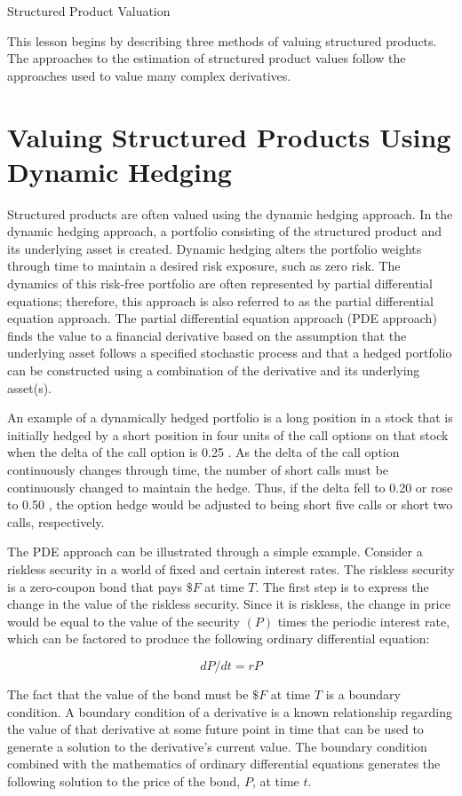 \documentclass[11pt]{article}
\begin{document}
Structured Product Valuation

This lesson begins by describing three methods of valuing structured products. The approaches to the estimation of structured product values follow the approaches used to value many complex derivatives.

\section*{Valuing Structured Products Using Dynamic Hedging}
Structured products are often valued using the dynamic hedging approach. In the dynamic hedging approach, a portfolio consisting of the structured product and its underlying asset is created. Dynamic hedging alters the portfolio weights through time to maintain a desired risk exposure, such as zero risk. The dynamics of this risk-free portfolio are often represented by partial differential equations; therefore, this approach is also referred to as the partial differential equation approach. The partial differential equation approach (PDE approach) finds the value to a financial derivative based on the assumption that the underlying asset follows a specified stochastic process and that a hedged portfolio can be constructed using a combination of the derivative and its underlying asset(s).

An example of a dynamically hedged portfolio is a long position in a stock that is initially hedged by a short position in four units of the call options on that stock when the delta of the call option is 0.25 . As the delta of the call option continuously changes through time, the number of short calls must be continuously changed to maintain the hedge. Thus, if the delta fell to 0.20 or rose to 0.50 , the option hedge would be adjusted to being short five calls or short two calls, respectively.

The PDE approach can be illustrated through a simple example. Consider a riskless security in a world of fixed and certain interest rates. The riskless security is a zero-coupon bond that pays $\$ F$ at time $T$. The first step is to express the change in the value of the riskless security. Since it is riskless, the change in price would be equal to the value of the security $(P)$ times the periodic interest rate, which can be factored to produce the following ordinary differential equation:

$$
d P / d t=r P
$$

The fact that the value of the bond must be $\$ F$ at time $T$ is a boundary condition. A boundary condition of a derivative is a known relationship regarding the value of that derivative at some future point in time that can be used to generate a solution to the derivative's current value. The boundary condition combined with the mathematics of ordinary differential equations generates the following solution to the price of the bond, $P$, at time $t$.
\end{document}
